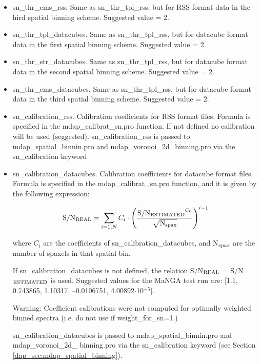 \begin{itemize}
  \item sn\_thr\_ems\_rss. Same as sn\_thr\_tpl\_rss, but for RSS
    format data in the hird spatial binning scheme. Suggested value =
    2.

  \item sn\_thr\_tpl\_datacubes. Same as sn\_thr\_tpl\_rss, but for
    datacube format data in the first spatial binning scheme.
    Suggested value = 2.

  \item sn\_thr\_str\_datacubes.  Same as sn\_thr\_tpl\_rss, but for
    datacube format data in the second spatial binning scheme.
    Suggested value = 2.

  \item sn\_thr\_ems\_datacubes. Same as sn\_thr\_tpl\_rss, but for
    datacube format data in the third spatial binning scheme.
    Suggested value = 2.

  \item sn\_calibration\_rss. Calibration coefficients for RSS format
    files. Formula is specified in the mdap\_calibrat\_sn.pro
    function. If not defined no calibration will be used (seggested).
    sn\_calibration\_rss is passed to mdap\_spatial\_binnin.pro and
    mdap\_voronoi\_2d\_binning.pro via the sn\_calibration keyword


 \item sn\_calibration\_datacubes. Calibration coefficients for
   datacube format files. Formula is specified in the
   mdap\_calibrat\_sn.pro function, and it is given by the following
   expression:

   \[
    {\rm S/N_{REAL}} = \sum_{i=1,N} C_i \cdot \left( \frac{{\rm S/N_{ESTIMATED}}^{C_0}}{ \sqrt{{\rm N}_{\rm spax} }} \right)^{i-1} 
   \]

   where $C_i$ are the coefficients of sn\_calibration\_datacubes, and
   N$_{\rm spax}$ are the number of spaxels in that spatial bin.

   If sn\_calibration\_datacubes is not defined, the relation
   S/N$_{\rm REAL}$ = S/N$_{\rm ESTIMATED}$ is used. Suggested values
   for the MaNGA test run are: [1.1, 0.743865, 1.10317, --0.0106751,
     4.00892$\cdot$10$^{-5}$].

   Warning: Coefficient calibrations were not computed for optimally
   weighted binned spectra (i.e. do not use if weight\_for\_sn=1.)

   sn\_calibration\_datacubes is passed to mdap\_spatial\_binnin.pro
   and mdap\_voronoi\_2d\_ binning.pro via the sn\_calibration keyword
   (see Section \ref{dap_sec:mdap_spatial_binning}).


\end{itemize}
